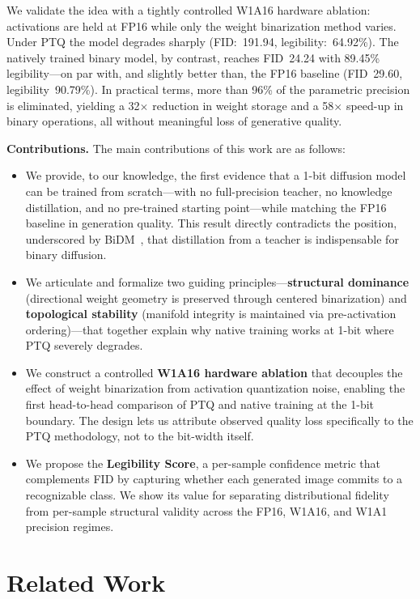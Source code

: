 \documentclass[twocolumn, journal]{IEEEtran}
\begin{document}
We validate the idea with a tightly controlled W1A16 hardware ablation: activations are
held at FP16 while only the weight binarization method varies. Under PTQ the model
degrades sharply (FID:~191.94, legibility:~64.92\%). The natively trained binary model,
by contrast, reaches FID~24.24 with 89.45\% legibility---on par with, and slightly
better than, the FP16 baseline (FID~29.60, legibility~90.79\%). In practical terms,
more than 96\% of the parametric precision is eliminated, yielding a 32$\times$
reduction in weight storage and a 58$\times$ speed-up in binary operations, all without
meaningful loss of generative quality.

\textbf{Contributions.} The main contributions of this work are as follows:
\begin{itemize}
  \item We provide, to our knowledge, the first evidence that a 1-bit diffusion model
    can be trained from scratch---with no full-precision teacher, no knowledge
    distillation, and no pre-trained starting point---while matching the FP16 baseline
    in generation quality. This result directly contradicts the position, underscored by
    BiDM~\cite{bidm2024}, that distillation from a teacher is indispensable for binary
    diffusion.
  \item We articulate and formalize two guiding principles---\textbf{structural
    dominance} (directional weight geometry is preserved through centered binarization)
    and \textbf{topological stability} (manifold integrity is maintained via
    pre-activation ordering)---that together explain why native training works at 1-bit
    where PTQ severely degrades.
  \item We construct a controlled \textbf{W1A16 hardware ablation} that decouples the
    effect of weight binarization from activation quantization noise, enabling the first
    head-to-head comparison of PTQ and native training at the 1-bit boundary. The
    design lets us attribute observed quality loss specifically to the PTQ methodology,
    not to the bit-width itself.
  \item We propose the \textbf{Legibility Score}, a per-sample confidence metric that
    complements FID by capturing whether each generated image commits to a recognizable
    class. We show its value for separating distributional fidelity from per-sample
    structural validity across the FP16, W1A16, and W1A1 precision regimes.
\end{itemize}


\section{Related Work}
\end{document}
